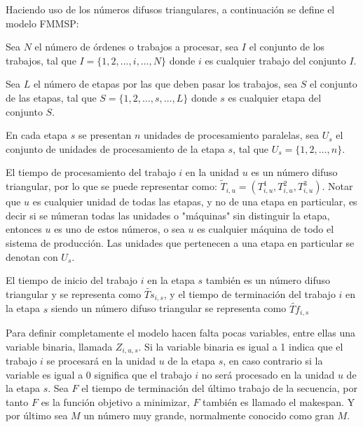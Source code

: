 \documentclass{article}
\begin{document}
\vspace{\baselineskip}
Haciendo uso de los números difusos triangulares, a continuación se define el modelo FMMSP: \autocite{modFMMSP}

\vspace{\baselineskip}
Sea $N$ el número de órdenes o trabajos a procesar, sea $I$ el conjunto de los trabajos, tal que $I = \{1,2,\dots,i,\dots,N\}$ donde $i$ es cualquier trabajo del conjunto $I$.

\vspace{\baselineskip}
Sea $L$ el número de etapas por las que deben pasar los trabajos, sea $S$ el conjunto de las etapas, tal que $S = \{1,2,\dots,s,\dots,L\}$ donde $s$ es cualquier etapa del conjunto $S$.

\vspace{\baselineskip}
En cada etapa $s$ se presentan $n$ unidades de procesamiento paralelas, sea $U_s$ el conjunto de unidades de procesamiento de la etapa $s$, tal que $U_s = \{1,2,\dots,n\}$.

\vspace{\baselineskip}
El tiempo de procesamiento del trabajo $i$ en la unidad $u$ es un número difuso triangular, por lo que se puede representar como: $\tilde{T}_{i,u} = (T_{i,u}^{1},T_{i,u}^{2},T_{i,u}^{3})$. Notar que $u$ es cualquier unidad de todas las etapas, y no de una etapa en particular, es decir si se númeran todas las unidades o "máquinas" sin distinguir la etapa, entonces $u$ es uno de estos números, o sea $u$ es cualquier máquina de todo el sistema de producción. Las unidades que pertenecen a una etapa en particular se denotan con $U_s$.

El tiempo de inicio del trabajo $i$ en la etapa $s$ también es un número difuso triangular y se representa como $\widetilde{Ts}_{i,s}$, y el tiempo de terminación del trabajo $i$ en la etapa $s$ siendo un número difuso triangular se representa como $\widetilde{Tf}_{i,s}$

\vspace{\baselineskip}
Para definir completamente el modelo hacen falta pocas variables, entre ellas una variable binaria, llamada $Z_{i,u,s}$. Si la variable binaria es igual a 1 indica que el trabajo $i$ se procesará en la unidad $u$ de la etapa $s$, en caso contrario si la variable es igual a 0 significa que el trabajo $i$ no será procesado en la unidad $u$ de la etapa $s$. Sea $F$ el tiempo de terminación del último trabajo de la secuencia, por tanto $F$ es la función objetivo a minimizar, $F$ también es llamado el makespan. Y por último sea $M$ un número muy grande, normalmente conocido como gran $M$.
\end{document}

